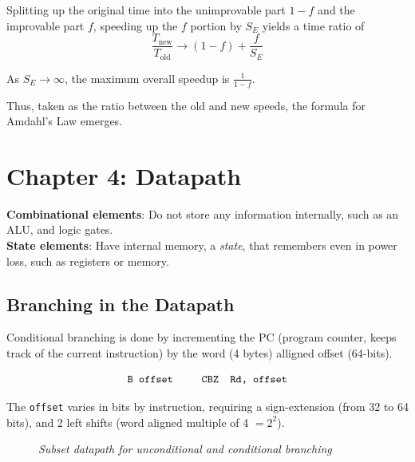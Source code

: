 \documentclass[11pt]{article}
\begin{document}
Splitting up the original time into the unimprovable part $1-f$ and the improvable part $f$, speeding up the $f$ portion by $S_E$ yields a time ratio of $$\frac{T_\text{new}}{T_\text{old}}\rightarrow (1-f) + \frac{f}{S_E}$$

As $S_E \rightarrow \infty$, the maximum overall speedup is $\frac{1}{1-f}$.

Thus, taken as the ratio between the old and new speeds, the formula for Amdahl's Law emerges.

\pagebreak

\section*{Chapter 4: Datapath}

\begin{tcolorbox}[
    enhanced,
    attach boxed title to top left={xshift=6mm,yshift=-1.5mm},
    colback=moonstoneblue!20,
    colframe=moonstoneblue,
    colbacktitle=moonstoneblue,
    title=Logic Design Elements,
    fonttitle=\bfseries\color{white},
    boxed title style={size=small,colframe=moonstoneblue,sharp corners},
    sharp corners,
    label=box:logic-types,
]
    {\color{moondark}\textbf{Combinational elements}}: Do not store any information internally, such as an ALU, and logic gates. \\
    {\color{moondark}\textbf{State elements}}: Have internal memory, a \textit{state}, that remembers even in power loss, such as registers or memory.
\end{tcolorbox}

\subsection*{Branching in the Datapath}

Conditional branching is done by incrementing the PC (program counter, keeps track of the current instruction) by the word (4 bytes) alligned offset (64-bits).

\vspace{-1em}
$$\texttt{B offset \quad \quad CBZ \ Rd, offset}$$

The \texttt{offset} varies in bits by instruction, requiring a sign-extension (from 32 to 64 bits), and 2 left shifts (word aligned multiple of 4 $=2^2$).

\begin{figure}[htbp]
    \centering
    \caption{\textit{Subset datapath for unconditional and conditional branching}}
    \label{fig:data-branch}
\end{figure}
\end{document}
